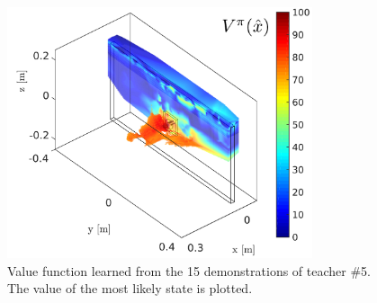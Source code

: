 \begin{figure}
 \centering
 \includegraphics[width=0.8\textwidth]{./ch4-PiH/Figures/Fig/value_subj_5.pdf}
 \caption{Value function learned from the 15 demonstrations of teacher \#5. The value of the most likely state is plotted.}
 \label{fig:value_function_subj_5}
\end{figure}
 
